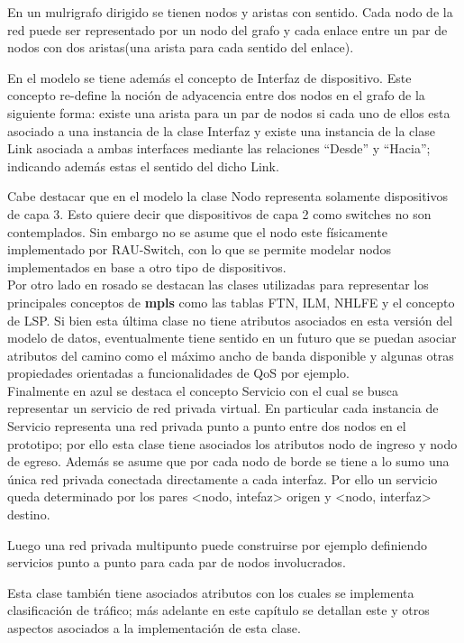 \newpage
En un mulrigrafo dirigido se tienen nodos y aristas con sentido. Cada nodo de la red puede ser representado por un nodo del grafo y cada enlace entre un par de nodos con dos aristas(una arista para cada sentido del enlace).

En el modelo se tiene adem\'as el concepto de Interfaz de dispositivo. Este concepto re-define la noción de adyacencia entre dos nodos en el grafo de la siguiente forma: existe una arista para un par de nodos si cada uno de ellos esta asociado a una instancia de la clase Interfaz y existe una instancia de la clase Link asociada a ambas interfaces mediante las relaciones “Desde” y “Hacia”; indicando adem\'as estas el sentido del dicho Link.

Cabe destacar que en el modelo la clase Nodo representa solamente dispositivos de capa 3. Esto quiere decir que dispositivos de capa 2 como switches no son contemplados. Sin embargo no se asume que el nodo este f\'isicamente implementado por RAU-Switch, con lo que se permite modelar nodos implementados en base a otro tipo de dispositivos.\\

Por otro lado en rosado se destacan las clases utilizadas para representar los principales conceptos de \textbf{mpls} como las tablas FTN, ILM, NHLFE y el concepto de LSP. Si bien esta \'ultima clase no tiene atributos asociados en esta versi\'on del modelo de datos, eventualmente tiene sentido en un futuro que se puedan asociar atributos del camino como el m\'aximo ancho de banda disponible y algunas otras propiedades orientadas a funcionalidades de QoS por ejemplo.\\

Finalmente en azul se destaca el concepto Servicio con el cual se busca representar un servicio de red privada virtual. En particular cada instancia de Servicio representa una red privada punto a punto entre dos nodos en el prototipo; por ello esta clase tiene asociados los atributos nodo de ingreso y nodo de egreso. Adem\'as se asume que por cada nodo de borde se tiene a lo sumo una \'unica red privada conectada directamente a cada interfaz. Por ello un servicio queda determinado por los pares <nodo, intefaz> origen y <nodo, interfaz> destino. 

Luego una red privada multipunto puede construirse por ejemplo definiendo servicios punto a punto para cada par de nodos involucrados.

Esta clase también tiene asociados atributos con los cuales se implementa clasificaci\'on de tr\'afico; m\'as adelante en este cap\'itulo se detallan este y otros aspectos asociados a la implementaci\'on de esta clase.\\

